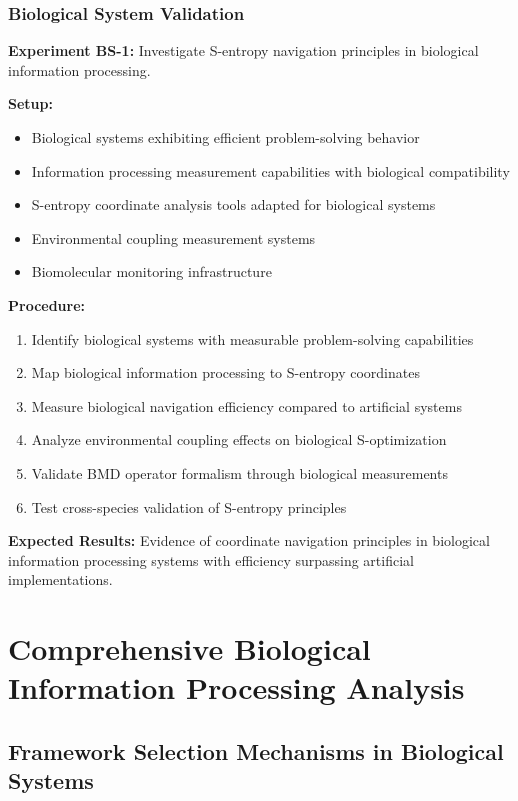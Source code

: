 \documentclass[11pt]{article}
\theoremstyle{definition}
\theoremstyle{remark}
\begin{document}
\subsubsection{Biological System Validation}

\textbf{Experiment BS-1:} Investigate S-entropy navigation principles in biological information processing.

\textbf{Setup:}
\begin{itemize}
\item Biological systems exhibiting efficient problem-solving behavior
\item Information processing measurement capabilities with biological compatibility
\item S-entropy coordinate analysis tools adapted for biological systems
\item Environmental coupling measurement systems
\item Biomolecular monitoring infrastructure
\end{itemize}

\textbf{Procedure:}
\begin{enumerate}
\item Identify biological systems with measurable problem-solving capabilities
\item Map biological information processing to S-entropy coordinates
\item Measure biological navigation efficiency compared to artificial systems
\item Analyze environmental coupling effects on biological S-optimization
\item Validate BMD operator formalism through biological measurements
\item Test cross-species validation of S-entropy principles
\end{enumerate}

\textbf{Expected Results:} Evidence of coordinate navigation principles in biological information processing systems with efficiency surpassing artificial implementations.

\section{Comprehensive Biological Information Processing Analysis}

\subsection{Framework Selection Mechanisms in Biological Systems}
\end{document}
